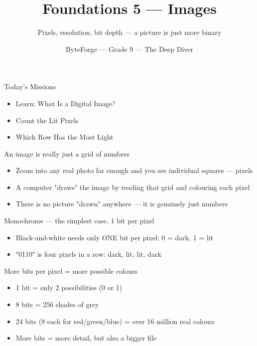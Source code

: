 \documentclass[aspectratio=169]{beamer}
\title{Foundations 5 — Images}
\subtitle{Pixels, resolution, bit depth --- a picture is just more binary}
\author{ByteForge --- Grade 9 --- The Deep Diver}
\date{}
\begin{document}
\begin{frame}
    \titlepage
\end{frame}

\begin{frame}{Today's Missions}
    \Large
    \begin{itemize}
        \item Learn: What Is a Digital Image?
        \item Count the Lit Pixels
        \item Which Row Has the Most Light
    \end{itemize}
\end{frame}

\begin{frame}{An image is really just a grid of numbers}
    \large
    \begin{itemize}
        \item Zoom into any real photo far enough and you see individual squares --- pixels
        \item A computer "draws" the image by reading that grid and colouring each pixel
        \item There is no picture "drawn" anywhere --- it is genuinely just numbers
    \end{itemize}
\end{frame}


\begin{frame}{Monochrome --- the simplest case, 1 bit per pixel}
    \large
    \begin{itemize}
        \item Black-and-white needs only ONE bit per pixel: 0 = dark, 1 = lit
        \item "0110" is four pixels in a row: dark, lit, lit, dark
    \end{itemize}
\end{frame}


\begin{frame}{More bits per pixel = more possible colours}
    \large
    \begin{itemize}
        \item 1 bit = only 2 possibilities (0 or 1)
        \item 8 bits = 256 shades of grey
        \item 24 bits (8 each for red/green/blue) = over 16 million real colours
        \item More bits = more detail, but also a bigger file
    \end{itemize}
\end{frame}
\end{document}
